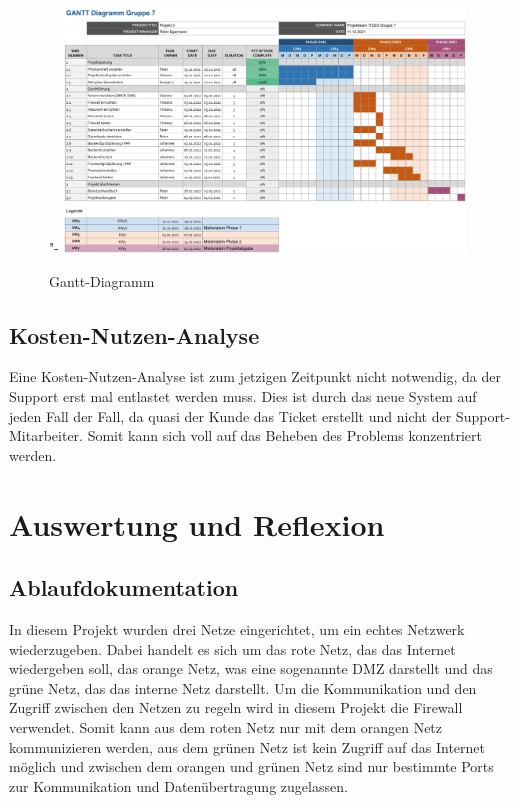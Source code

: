 \documentclass[a4paper,
    11pt,
    headings=small,
    ngerman,
    listof=totoc,
    numbers=noenddot]{scrreprt}[2021/11/13]
\begin{document}
\begin{figure}[htbp]"-
  \centering
  \includegraphics[width=0.95\textwidth]{data/Gantt.png}
  \caption{Gantt-Diagramm}
  \label{fig:GanttKlein}
\end{figure}



\section{Kosten-Nutzen-Analyse}

Eine Kosten-Nutzen-Analyse ist zum jetzigen Zeitpunkt nicht notwendig, da der Support erst mal entlastet werden muss. Dies ist durch das neue System auf jeden Fall der Fall, da quasi der Kunde das Ticket erstellt und nicht der Support-Mitarbeiter. Somit kann sich voll auf das Beheben des Problems konzentriert werden.




\chapter{Auswertung und Reflexion}



\section{Ablaufdokumentation}

In diesem Projekt wurden drei Netze eingerichtet, um ein echtes Netzwerk wiederzugeben. Dabei handelt es sich um das rote Netz, das das Internet wiedergeben soll, das orange Netz, was eine sogenannte \ac{DMZ} darstellt und das grüne Netz, das das interne Netz darstellt.
Um die Kommunikation und den Zugriff zwischen den Netzen zu regeln wird in diesem Projekt die Firewall verwendet. Somit kann aus dem roten Netz nur mit dem orangen Netz kommunizieren werden, aus dem grünen Netz ist kein Zugriff auf das Internet möglich und zwischen dem orangen und grünen Netz sind nur bestimmte Ports zur Kommunikation und Datenübertragung zugelassen.
\end{document}
